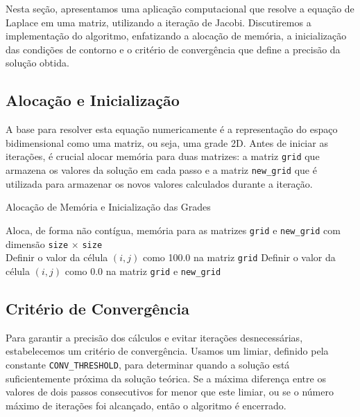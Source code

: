 \documentclass[conference]{IEEEtran}
\begin{document}
Nesta seção, apresentamos uma aplicação computacional que resolve a equação de Laplace em uma matriz, utilizando a iteração de Jacobi. Discutiremos a implementação do algoritmo, enfatizando a alocação de memória, a inicialização das condições de contorno e o critério de convergência que define a precisão da solução obtida.

\subsection{Alocação e Inicialização}

A base para resolver esta equação numericamente é a representação do espaço bidimensional como uma matriz, ou seja, uma grade 2D. Antes de iniciar as iterações, é crucial alocar memória para duas matrizes: a matriz \texttt{grid} que armazena os valores da solução em cada passo e a matriz \texttt{new\_grid} que é utilizada para armazenar os novos valores calculados durante a iteração.

\begin{algorithm}[H]
    \caption{Alocação de Memória e Inicialização das Grades}
    \begin{algorithmic}[1]
        \State Aloca, de forma não contígua, memória para as matrizes \texttt{grid} e \texttt{new\_grid} com dimensão \texttt{size} \(\times\) \texttt{size}
        \EndFunction
        \\
        \State Definir o valor da célula $(i, j)$ como 100.0 na matriz
        \texttt{grid}
        \Else
        \State Definir o valor da célula $(i, j)$ como 0.0 na matriz \texttt{grid} e \texttt{new\_grid}
        \EndIf
        \EndFor
        \EndFunction
    \end{algorithmic}
\end{algorithm}



\subsection{Critério de Convergência}

Para garantir a precisão dos cálculos e evitar iterações desnecessárias, estabelecemos um critério de convergência. Usamos um limiar, definido pela constante \texttt{CONV\_THRESHOLD}, para determinar quando a solução está suficientemente próxima da solução teórica. Se a máxima diferença entre os valores de dois passos consecutivos for menor que este limiar, ou se o número máximo de iterações foi alcançado, então o algoritmo é encerrado.
\end{document}
